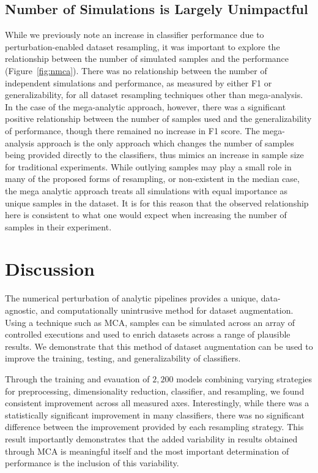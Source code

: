 \documentclass[10pt]{SelfArx} %
\begin{document}
\subsection*{Number of Simulations is Largely Unimpactful}

While we previously note an increase in classifier performance due to perturbation-enabled dataset resampling, it was
important to explore the relationship between the number of simulated samples and the performance
(Figure~\ref{fig:nmca}). There was no relationship between the number of independent simulations and performance, as
measured by either F1 or generalizability, for all dataset resampling techniques other than mega-analysis. In the case
of the mega-analytic approach, however, there was a significant positive relationship between the number of samples
used and the generalizability of performance, though there remained no increase in F1 score. The mega-analysis approach
is the only approach which changes the number of samples being provided directly to the classifiers, thus mimics an
increase in sample size for traditional experiments. While outlying samples may play a small role in many of the
proposed forms of resampling, or non-existent in the median case, the mega analytic approach treats all simulations
with equal importance as unique samples in the dataset. It is for this reason that the observed relationship here
is consistent to what one would expect when increasing the number of samples in their experiment.

\section*{Discussion}

The numerical perturbation of analytic pipelines provides a unique, data-agnostic, and computationally unintrusive
method for dataset augmentation. Using a technique such as MCA, samples can be simulated across an array of controlled
executions and used to enrich datasets across a range of plausible results. We demonstrate that this method of dataset
augmentation can be used to improve the training, testing, and generalizability of classifiers.

Through the training and evauation of $2,200$ models combining varying strategies for preprocessing, dimensionality
reduction, classifier, and resampling, we found consistent improvement across all measured axes. Interestingly, while
there was a statistically significant improvement in many classifiers, there was no significant difference between the
improvement provided by each resampling strategy. This result importantly demonstrates that the added variability in
results obtained through MCA is meaningful itself and the most important determination of performance is the inclusion
of this variability.
\end{document}
